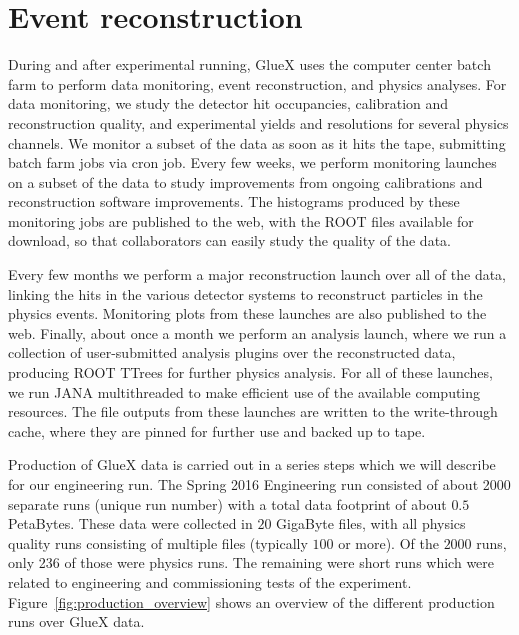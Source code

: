 

\section[Event reconstruction (Alex A.)]{Event reconstruction \label{sec:reconstruction}}


During and after experimental running, GlueX uses the computer center batch farm to perform data monitoring, event reconstruction, and physics analyses.  For data monitoring, we study the detector hit occupancies, calibration and reconstruction quality, and experimental yields and resolutions for several physics channels.  We monitor a subset of the data as soon as it hits the tape, submitting batch farm jobs via cron job.  Every few weeks, we perform monitoring launches on a subset of the data to study improvements from ongoing calibrations and reconstruction software improvements.  The histograms produced by these monitoring jobs are published to the web, with the ROOT files available for download, so that collaborators can easily study the quality of the data. 

Every few months we perform a major reconstruction launch over all of the data, linking the hits in the various detector systems to reconstruct particles in the physics events.  Monitoring plots from these launches are also published to the web. Finally, about once a month we perform an analysis launch, where we run a collection of user-submitted analysis plugins over the reconstructed data, producing ROOT TTrees for further physics analysis. For all of these launches, we run JANA multithreaded to make efficient use of the available computing resources. %
The file outputs from these launches are written to the write-through cache, where they are pinned for further use and backed up to tape.  

Production of GlueX data is carried out in a series steps which we will describe for our engineering run. The Spring 2016 Engineering run consisted of about 2000 separate runs (unique run number) with a total data footprint of about $0.5$ PetaBytes. These data were collected in $20$ GigaByte files, with all physics quality runs consisting of multiple files (typically $100$ or more). Of the $2000$ runs, only 236 of those 
were physics runs. The remaining were short runs which were related to engineering and commissioning tests of the experiment. Figure~\ref{fig:production_overview} shows an overview of the different production runs over GlueX data. 

